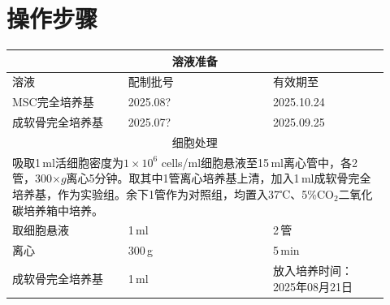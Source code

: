 \documentclass[UTF8,10pt,a4paper,fontset=fandol]{ctexart}
\newcommand{\fieldvalue}[1]{#1}
\newcommand{\handwritten}[1]{#1}
\begin{document}
\section{操作步骤}

\begin{center}
\small
\begin{tabular}{|p{0.29\linewidth}|p{0.35\linewidth}|p{0.28\linewidth}|}
\hline
\multicolumn{3}{|c|}{溶液准备} \\ \hline
溶液 & 配制批号 & 有效期至 \\ \hline
MSC完全培养基 &
\fieldvalue{\handwritten{2025.08?}} &
\fieldvalue{\handwritten{2025.10.24}} \\ \hline
成软骨完全培养基 &
\fieldvalue{\handwritten{2025.07?}} &
\fieldvalue{\handwritten{2025.09.25}} \\ \hline
\multicolumn{3}{|c|}{细胞处理} \\ \hline
\multicolumn{3}{|p{0.92\linewidth}|}{
吸取1\,ml活细胞密度为$1\times10^{6}$ cells/ml细胞悬液至15\,ml离心管中，各2管，300$\times g$离心5分钟。取其中1管离心培养基上清，加入1\,ml成软骨完全培养基，作为实验组。余下1管作为对照组，均置入37℃、5\%CO$_2$二氧化碳培养箱中培养。
} \\ \hline
取细胞悬液 &
\fieldvalue{\handwritten{1}}\,ml &
\fieldvalue{\handwritten{2}}\,管 \\ \hline
离心 &
\fieldvalue{\handwritten{300}}\,g &
\fieldvalue{\handwritten{5}}\,min \\ \hline
成软骨完全培养基 &
\fieldvalue{\handwritten{1}}\,ml &
放入培养时间：%
\fieldvalue{\handwritten{2025年08月21日}} \\ \hline
\end{tabular}
\end{center}
\end{document}
